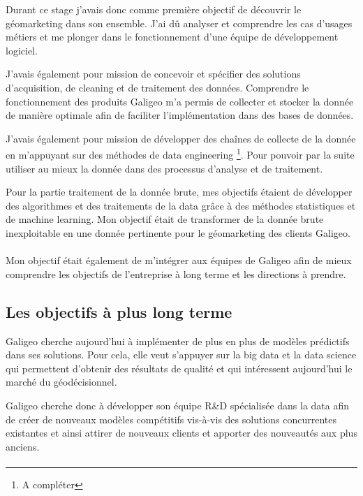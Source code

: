 Durant ce stage j’avais donc comme première objectif de découvrir le géomarketing dans son ensemble. J’ai dû analyser et comprendre les cas d’usages métiers et me plonger dans le fonctionnement d’une équipe de développement logiciel.

J’avais également pour mission de concevoir et spécifier des solutions d’acquisition, de cleaning et de traitement des données. Comprendre le fonctionnement des produits Galigeo m’a permis de collecter et stocker la donnée de manière optimale afin de faciliter l’implémentation dans des bases de données.

J’avais également pour mission de développer des chaînes de collecte de la donnée en m’appuyant sur des méthodes de data engineering \footnote{A compléter}. Pour pouvoir par la suite utiliser au mieux la donnée dans des processus d’analyse et de traitement.

Pour la partie traitement de la donnée brute, mes objectifs étaient de développer des algorithmes et des traitements de la data grâce à des méthodes statistiques et de machine learning. Mon objectif était de transformer de la donnée brute inexploitable en une donnée pertinente pour le géomarketing des clients Galigeo.

\paragraph*{}

Mon objectif était également de m’intégrer aux équipes de Galigeo afin de mieux comprendre les objectifs de l’entreprise à long terme et les directions à prendre.


\subsection{Les objectifs à plus long terme}

Galigeo cherche aujourd’hui à implémenter de plus en plus de modèles prédictifs dans ses solutions. Pour cela, elle veut s’appuyer sur la big data et la data science qui permettent d’obtenir des résultats de qualité et qui intéressent aujourd’hui le marché du géodécisionnel.

Galigeo cherche donc à développer son équipe R\&D spécialisée dans la data afin de créer de nouveaux modèles compétitifs vis-à-vis des solutions concurrentes existantes et ainsi attirer de nouveaux clients et apporter des nouveautés aux plus anciens.

\paragraph*{}

